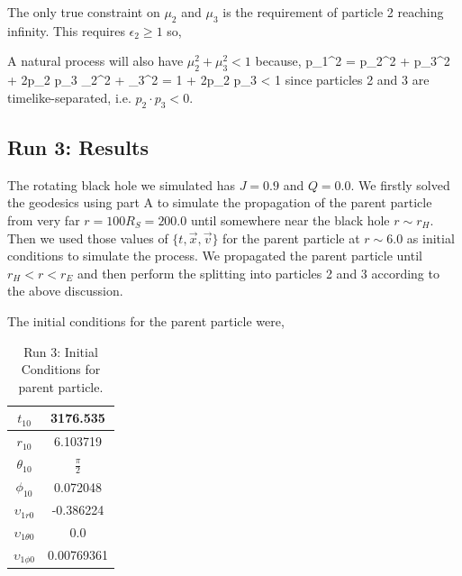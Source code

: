 The only true constraint on $\mu_2$ and $\mu_3$ is the requirement of particle 2 reaching infinity. This requires $\epsilon_2\ge1$ so,
\be
\ee

A natural process will also have $\mu_2^2 + \mu_3^2 < 1$ because,
\be
	p_1^2 = p_2^2 + p_3^2 + 2p_2 \cdot p_3 \Rightarrow \mu_2^2 + \mu_3^2 = 1 + 2p_2 \cdot p_3 < 1
\ee
since particles 2 and 3 are timelike-separated, i.e. $p_2 \cdot p_3 < 0$.

\subsection{Run 3: Results}
The rotating black hole we simulated has $J=0.9$ and $Q=0.0$. We firstly solved the geodesics using part A to simulate the propagation of the parent particle from very far $r = 100R_{S} = 200.0$ until somewhere near the black hole $r \sim r_{H} $. Then we used those values of $\{t,\vec{x},\vec{v}\}$ for the parent particle at $r\sim6.0$ as initial conditions to simulate the process. We propagated the parent particle until $r_{H} < r < r_{E}$ and then perform the splitting into particles 2 and 3 according to the above discussion.

The initial conditions for the parent particle were,
\begin{table}[H]
	\centering
	\begin{tabular}{|c|c|}
		\hline
		$t_{10}$ & 3176.535 \\
		\hline
		$r_{10}$ & 6.103719 \\
		\hline
		$\theta_{10}$ & $\frac{\pi}{2}$ \\
		\hline
		$\phi_{10}$ & 0.072048 \\
		\hline
		\hline
		$\upsilon_{1r0}$ & -0.386224 \\
		\hline
		$\upsilon_{1\theta0}$ & 0.0 \\
		\hline
		$\upsilon_{1\phi0}$ & 0.00769361 \\
		\hline
	\end{tabular}
	\caption[Run 3: Initial Conditions for parent particle]{Run 3: Initial Conditions for parent particle.}
	\label{tbl:RUN3_IC}
\end{table}

